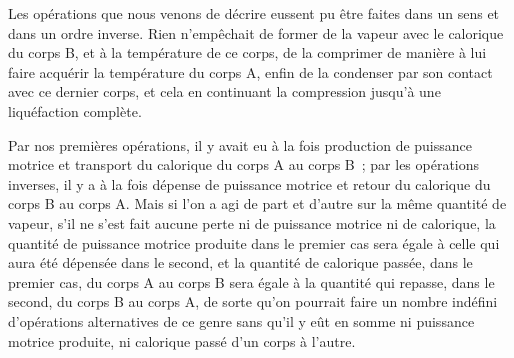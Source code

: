 \documentclass[french,twoside]{book} %
\begin{document}
\noindent Les opérations que nous venons de décrire eussent pu être faites dans un sens et dans un ordre inverse. Rien n’empêchait de former de la vapeur avec le calorique du corps B, et à la température de ce corps, de la comprimer de manière à lui faire acquérir la température du corps A, enfin de la condenser par son contact avec ce dernier corps, et cela en continuant la compression jusqu’à une liquéfaction complète.\par
Par nos premières opérations, il y avait eu à la fois production de puissance motrice et transport du calorique du corps A au corps B ; par les opérations inverses, il y a à la fois dépense de puissance motrice et retour du calorique du corps B au corps A. Mais si l’on a agi de part et d’autre sur la même quantité de vapeur, s’il ne s’est fait aucune perte ni de puissance motrice ni de calorique, la quantité de puissance motrice produite dans le premier cas sera égale à celle qui aura été dépensée dans le second, et la quantité de calorique passée, dans le premier cas, du corps A au corps B sera égale à la quantité qui repasse, dans le second, du corps B au corps A, de sorte qu’on pourrait faire un nombre indéfini d’opérations alternatives de ce genre sans qu’il y eût en somme ni puissance motrice produite, ni calorique passé d’un corps à l’autre.\par
\end{document}

